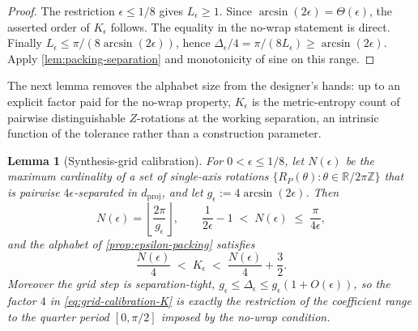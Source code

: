 \documentclass[aps,prx,reprint,floatfix,superscriptaddress]{revtex4-2}
\newtheorem{lemma}{Lemma}
\begin{document}
\begin{proof}
The restriction $\epsilon\leq1/8$ gives $L_\epsilon\geq1$.
Since $\arcsin(2\epsilon)=\Theta(\epsilon)$, the asserted order of
$K_\epsilon$ follows.  The equality in the no-wrap statement is direct.
Finally $L_\epsilon\leq\pi/(8\arcsin(2\epsilon))$, hence
$\Delta_\epsilon/4=\pi/(8L_\epsilon)\geq\arcsin(2\epsilon)$.
Apply \cref{lem:packing-separation} and monotonicity of sine on this range.
\end{proof}

The next lemma removes the alphabet size from the designer's hands: up to
an explicit factor paid for the no-wrap property, $K_\epsilon$ is the
metric-entropy count of pairwise distinguishable $Z$-rotations at the
working separation, an intrinsic function of the tolerance rather than a
construction parameter.

\begin{lemma}[Synthesis-grid calibration]
\label{lem:grid-calibration}
For $0<\epsilon\leq1/8$, let $N(\epsilon)$ be the maximum cardinality of
a set of single-axis rotations $\{R_P(\theta):\theta\in\mathbb
R/2\pi\mathbb Z\}$ that is pairwise $4\epsilon$-separated in
$d_{\mathrm{proj}}$, and let $g_\epsilon:=4\arcsin(2\epsilon)$.  Then
\begin{equation}\label{eq:grid-calibration}
 N(\epsilon)=\left\lfloor\frac{2\pi}{g_\epsilon}\right\rfloor,
 \qquad
 \frac{1}{2\epsilon}-1\;<\;N(\epsilon)\;\leq\;\frac{\pi}{4\epsilon},
\end{equation}
and the alphabet of \cref{prop:epsilon-packing} satisfies
\begin{equation}\label{eq:grid-calibration-K}
 \frac{N(\epsilon)}{4}\;<\;K_\epsilon\;<\;\frac{N(\epsilon)}{4}+\frac32 .
\end{equation}
Moreover the grid step is separation-tight,
$g_\epsilon\leq\Delta_\epsilon\leq g_\epsilon(1+O(\epsilon))$, so the
factor $4$ in \eqref{eq:grid-calibration-K} is exactly the restriction of
the coefficient range to the quarter period $[0,\pi/2]$ imposed by the
no-wrap condition.
\end{lemma}
\end{document}
